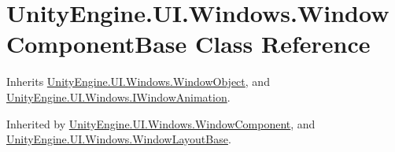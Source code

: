 \hypertarget{class_unity_engine_1_1_u_i_1_1_windows_1_1_window_component_base}{}\section{Unity\+Engine.\+U\+I.\+Windows.\+Window\+Component\+Base Class Reference}
\label{class_unity_engine_1_1_u_i_1_1_windows_1_1_window_component_base}


Inherits \hyperlink{class_unity_engine_1_1_u_i_1_1_windows_1_1_window_object}{Unity\+Engine.\+U\+I.\+Windows.\+Window\+Object}, and \hyperlink{interface_unity_engine_1_1_u_i_1_1_windows_1_1_i_window_animation}{Unity\+Engine.\+U\+I.\+Windows.\+I\+Window\+Animation}.



Inherited by \hyperlink{class_unity_engine_1_1_u_i_1_1_windows_1_1_window_component}{Unity\+Engine.\+U\+I.\+Windows.\+Window\+Component}, and \hyperlink{class_unity_engine_1_1_u_i_1_1_windows_1_1_window_layout_base}{Unity\+Engine.\+U\+I.\+Windows.\+Window\+Layout\+Base}.

